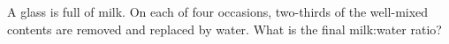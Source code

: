 A glass is full of milk. On each of four occasions, two-thirds of the well-mixed contents are removed and replaced by water. What is the final milk:water ratio?
